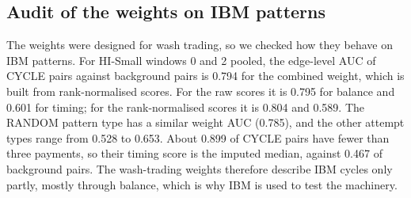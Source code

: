 \documentclass[conference]{IEEEtran}
\begin{document}
\begin{table}[t]
\caption{Candidate recall of complete CYCLE attempts on IBM data, $\tau$ quantile 0.05, maximum ring length 6. ``Reachable'' means at most 6 accounts. ``Recovered'' means a candidate with exactly the attempt's account set; ``labelled'' adds that the candidate carries a positive CYCLE label. Counts, not a sample: no interval. LI days 0--5 contains one complete attempt.}
\label{tab:recall}
\centering
\small
{}
\end{table}

\subsection{Audit of the weights on IBM patterns}
The weights were designed for wash trading, so we checked how they behave on IBM patterns. For HI-Small windows 0 and 2 pooled, the edge-level AUC of CYCLE pairs against background pairs is 0.794 for the combined weight, which is built from rank-normalised scores. For the raw scores it is 0.795 for balance and 0.601 for timing; for the rank-normalised scores it is 0.804 and 0.589. The RANDOM pattern type has a similar weight AUC (0.785), and the other attempt types range from 0.528 to 0.653. About 0.899 of CYCLE pairs have fewer than three payments, so their timing score is the imputed median, against 0.467 of background pairs. The wash-trading weights therefore describe IBM cycles only partly, mostly through balance, which is why IBM is used to test the machinery.
\end{document}
